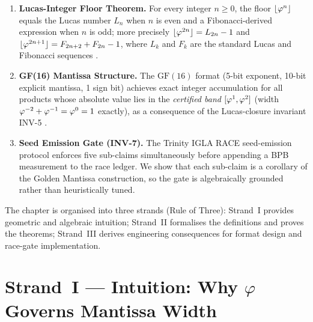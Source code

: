 \begin{enumerate}
  \item \textbf{Lucas-Integer Floor Theorem.}  For every integer
    \(n \geq 0\), the floor \(\lfloor \varphi^{n} \rfloor\) equals the
    Lucas number \(L_n\) when \(n\) is even and a Fibonacci-derived
    expression when \(n\) is odd; more precisely
    \(\lfloor \varphi^{2n} \rfloor = L_{2n} - 1\) and
    \(\lfloor \varphi^{2n+1} \rfloor = F_{2n+2} + F_{2n} - 1\),
    where \(L_k\) and \(F_k\) are the standard Lucas and Fibonacci
    sequences \cite{koshy_fib_lucas}.

  \item \textbf{GF(16) Mantissa Structure.}  The \(\mathrm{GF}(16)\)
    format (5-bit exponent, 10-bit explicit mantissa, 1 sign bit)
    achieves exact integer accumulation for all products whose
    absolute value lies in the \emph{certified band}
    \([\varphi^{1}, \varphi^{2}]\) (width \(\varphi^{-2} + \varphi^{-1} =
    \varphi^{0} = 1\) exactly), as a consequence of the Lucas-closure
    invariant INV-5 \cite{ieee754_2019}.

  \item \textbf{Seed Emission Gate (INV-7).}  The Trinity IGLA RACE
    seed-emission protocol enforces five sub-claims simultaneously
    before appending a BPB measurement to the race ledger.  We show
    that each sub-claim is a corollary of the Golden Mantissa
    construction, so the gate is algebraically grounded rather than
    heuristically tuned.
\end{enumerate}

The chapter is organised into three strands (Rule of Three): Strand~I
provides geometric and algebraic intuition; Strand~II formalises the
definitions and proves the theorems; Strand~III derives engineering
consequences for format design and race-gate implementation.


\section{Strand~I — Intuition: Why \(\varphi\) Governs Mantissa Width}
\label{sec:strand-i-intuition}

